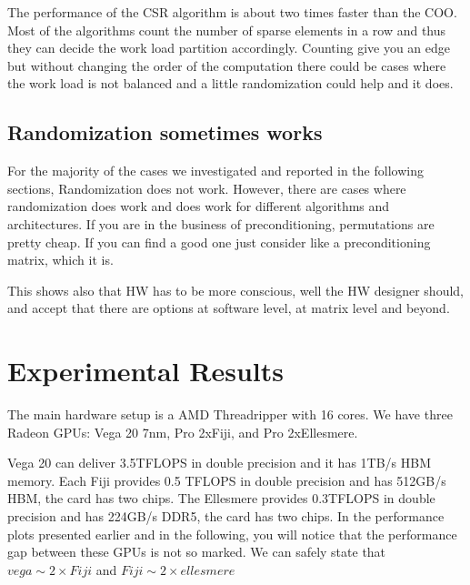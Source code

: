 \documentclass[manuscript,screen]{acmart}
\begin{document}
The performance of the CSR algorithm is about two times faster than the
COO. Most of the algorithms count the number of sparse elements in a
row and thus they can decide the work load partition
accordingly. Counting give you an edge but without changing the order
of the computation there could be cases where the work load is not
balanced and a little randomization could help and it does.

\subsection{Randomization sometimes works}

For the majority of the cases we investigated and reported in the
following sections, Randomization does not work. However, there are
cases where randomization does work and does work for different
algorithms and architectures. If you are in the business of
preconditioning, permutations are pretty cheap. If you can find a good
one just consider like a preconditioning matrix, which it is. 

This shows also that HW has to be more conscious, well the HW designer
should, and accept that there are options at software level, at matrix
level and beyond. 




\section{Experimental Results}
\label{sec:experimentalresults}
The main hardware setup is a AMD Threadripper with 16 cores. We have
three Radeon GPUs: Vega 20 7nm, Pro 2xFiji, and Pro 2xEllesmere.

Vega 20 can deliver 3.5TFLOPS in double precision and it has 1TB/s HBM
memory. Each Fiji provides 0.5 TFLOPS in double precision and has
512GB/s HBM, the card has two chips.  The Ellesmere provides 0.3TFLOPS
in double precision and has 224GB/s DDR5, the card has two chips. In
the performance plots presented earlier and in the following, you will
notice that the performance gap between these GPUs is not so
marked. We can safely state that $vega \sim 2\times Fiji$ and $Fiji \sim
2\times ellesmere$
\end{document}
